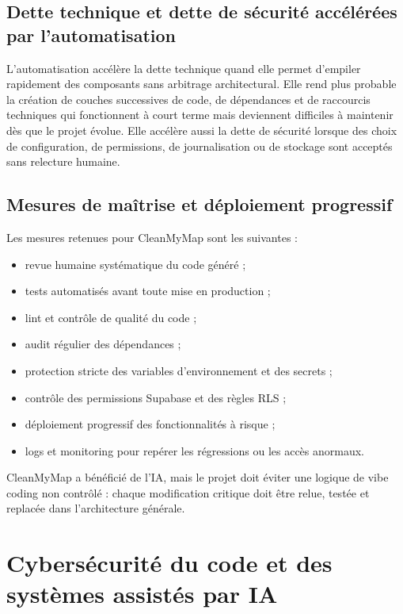\documentclass[
  10pt,
  a4paper,
  DIV=11,
  numbers=noendperiod,
  oneside]{scrreprt}
\providecommand{\tightlist}{%
  \setlength{\itemsep}{0pt}\setlength{\parskip}{0pt}}
\begin{document}
\subsection{Dette technique et dette de sécurité accélérées par
l'automatisation}\label{dette-technique-et-dette-de-suxe9curituxe9-accuxe9luxe9ruxe9es-par-lautomatisation}

L'automatisation accélère la dette technique quand elle permet d'empiler
rapidement des composants sans arbitrage architectural. Elle rend plus
probable la création de couches successives de code, de dépendances et
de raccourcis techniques qui fonctionnent à court terme mais deviennent
difficiles à maintenir dès que le projet évolue. Elle accélère aussi la
dette de sécurité lorsque des choix de configuration, de permissions, de
journalisation ou de stockage sont acceptés sans relecture humaine.

\subsection{Mesures de maîtrise et déploiement
progressif}\label{mesures-de-mauxeetrise-et-duxe9ploiement-progressif}

Les mesures retenues pour CleanMyMap sont les suivantes :

\begin{itemize}
\tightlist
\item
  revue humaine systématique du code généré ;
\item
  tests automatisés avant toute mise en production ;
\item
  lint et contrôle de qualité du code ;
\item
  audit régulier des dépendances ;
\item
  protection stricte des variables d'environnement et des secrets ;
\item
  contrôle des permissions Supabase et des règles RLS ;
\item
  déploiement progressif des fonctionnalités à risque ;
\item
  logs et monitoring pour repérer les régressions ou les accès anormaux.
\end{itemize}

CleanMyMap a bénéficié de l'IA, mais le projet doit éviter une logique
de vibe coding non contrôlé : chaque modification critique doit être
relue, testée et replacée dans l'architecture générale.

\section{Cybersécurité du code et des systèmes assistés par
IA}\label{cybersuxe9curituxe9-du-code-et-des-systuxe8mes-assistuxe9s-par-ia}
\end{document}
